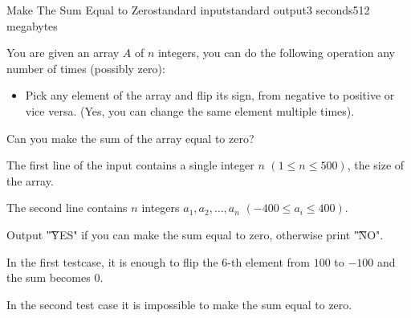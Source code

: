 \begin{problem}{Make The Sum Equal to Zero}{standard input}{standard output}{3 seconds}{512 megabytes}

You are given an array $A$ of $n$ integers, you can do the following operation any number of times (possibly zero):

\begin{itemize}
  \item Pick any element of the array and flip its sign, from negative to positive or vice versa. (Yes, you can change the same element multiple times).
\end{itemize}

Can you make the sum of the array equal to zero?

\InputFile
The first line of the input contains a single integer $n$ $(1 \leq n \leq 500)$, the size of the array.

The second line contains $n$ integers $a_1, a_2, \dots, a_n$ $(-400 \leq a_i \leq 400)$.

\OutputFile
Output \t{"YES"} if you can make the sum equal to zero, otherwise print \t{"NO"}.

\Examples

\begin{example}
%
%
\end{example}

\Note
In the first testcase, it is enough to flip the $6$-th element from $100$ to $-100$ and the sum becomes $0$.

In the second test case it is impossible to make the sum equal to zero.

\end{problem}

